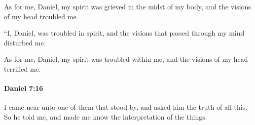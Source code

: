 			\begin{versebox}
					\item[BHS] 
					\item[LXX] 
					\item[ASV] As for me, Daniel, my spirit was grieved in the midst of my body, and the visions of my head troubled me.
					\item[NIV] “I, Daniel, was troubled in spirit, and the visions that passed through my mind disturbed me.
					\item[NRSV] As for me, Daniel, my spirit was troubled within me, and the visions of my head terrified me.
			\end{versebox}

		\paragraph{Daniel 7:16} %
			\label{DANIEL-7-16}

			I came near unto one of them that stood by, and asked him the truth of all this. So he told me, and made me know the interpretation of the things.

